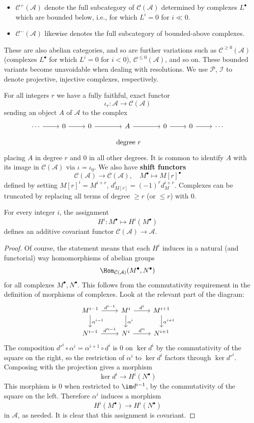 \begin{itemize}
\item $\mathcal{C}^+(\mathcal{A})$ denote the full subcategory of $\mathcal{C}(\mathcal{A})$ determined by complexes $L^{\bullet}$ which are bounded below, i.e., for 
which $L^i=0$ for $i\ll0$.
\item $\mathcal{C}^-(\mathcal{A})$ likewise denotes the full subcategory of bounded-above complexes.
\end{itemize}
These are also abelian categories, and so are further variations such as $\mathcal{C}^{\geq0}(\mathcal{A})$ (complexes $L^\bullet$ for which $L^i=0$ for $i<0$), 
$\mathcal{C}^{\leq0}(\mathcal{A})$, and so on. These bounded variants become unavoidable when dealing with resolutions. We use $\mathcal{P}$, $\mathcal{I}$ to denote 
projective, injective complexes, respectively.\par
For all integers $r$ we have a fully faithful, exact functor
\[\iota_r:\mathcal{A}\to\mathcal{C}(\mathcal{A})\]
sending an object $A$ of $\mathcal{A}$ to the complex
\[\begin{tikzcd}[row sep=small]
\cdots\ar[r]&0\ar[r]&0\ar[r]&A\ar[r]&0\ar[r]&0\ar[r]&\cdots\\
&&&\text{ degree }r&&&
\end{tikzcd}\]
placing $A$ in degree $r$ and $0$ in all other degrees. It is common to identify $A$ with
its image in $\mathcal{C}(\mathcal{A})$ via $\iota=\iota_0$. We also have \textbf{shift functors}
\[\mathcal{C}(\mathcal{A})\to\mathcal{C}(\mathcal{A}),\quad M^{\bullet}\mapsto M[r]^\bullet\]
defined by setting $M[r]^i=M^{i+r}$, $d^i_{M[r]}=(-1)^rd^{i+r}_{M}$. Complexes can be truncated by replacing all terms of degree $\geq r$ (or $\leq r$) with $0$.
\begin{lemma}
For every integer $i$, the assignment
\[H^i:M^\bullet\mapsto H^i(M^\bullet)\]
defines an additive covariant functor $\mathcal{C}(\mathcal{A})\to\mathcal{A}$.
\end{lemma}
\begin{proof}
Of course, the statement means that each $H^i$ induces in a natural (and functorial) way homomorphisms of abelian groups
\[\Hom_{\mathcal{C}(\mathcal{A})}(M^\bullet,N^\bullet)\]
for all complexes $M^\bullet,N^\bullet$. This follows from the commutativity requirement in the definition of morphisms of complexes. Look at the relevant part of the 
diagram:
\[\begin{tikzcd}
M^{i-1}\ar[r,"d^{i-1}"]\ar[d,"\alpha^{i-1}"]&M^i\ar[r,"d^i"]\ar[d,"\alpha^i"]&M^{i+1}\ar[d,"\alpha^{i+1}"]\\
N^{i-1}\ar[r,"d'^{i-1}"]&N^i\ar[r,"d'^i"]&N^{i+1}
\end{tikzcd}\]
The composition $d'^i\circ\alpha^i=\alpha^{i+1}\circ d^i$ is $0$ on $\ker d^i$ by the commutativity of the square on the right, so the restriction of $\alpha^i$ to 
$\ker d^i$ factors through $\ker d'^i$. Composing with the projection gives a morphism
\[\ker d^i\to H^i(N^\bullet)\]
This morphism is $0$ when restricted to $\im d^{i-1}$, by the commutativity of the square
on the left. Therefore $\alpha^i$ induces a morphism
\[H^i(M^\bullet)\to H^i(N^\bullet)\]
in $\mathcal{A}$, as needed. It is clear that this assignment is covariant.
\end{proof}
